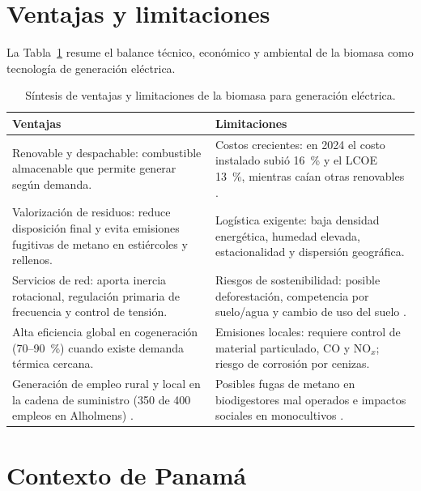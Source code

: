 \section{Ventajas y limitaciones}
\label{sec:ventajas_limitaciones}

La Tabla~\ref{tab:ventajas_limitaciones} resume el balance técnico, económico y ambiental de la biomasa como tecnología de generación eléctrica.

\begin{table}[htbp]
\centering
\caption{Síntesis de ventajas y limitaciones de la biomasa para generación eléctrica.}
\label{tab:ventajas_limitaciones}
\begin{tabularx}{\textwidth}{@{}X X@{}}
\toprule
\textbf{Ventajas} & \textbf{Limitaciones} \\
\midrule
Renovable y despachable: combustible almacenable que permite generar según demanda. & Costos crecientes: en 2024 el costo instalado subió 16~\% y el LCOE 13~\%, mientras caían otras renovables \cite{irena2025costs}. \\
Valorización de residuos: reduce disposición final y evita emisiones fugitivas de metano en estiércoles y rellenos. & Logística exigente: baja densidad energética, humedad elevada, estacionalidad y dispersión geográfica. \\
Servicios de red: aporta inercia rotacional, regulación primaria de frecuencia y control de tensión. & Riesgos de sostenibilidad: posible deforestación, competencia por suelo/agua y cambio de uso del suelo \cite{chum2011ipcc, fao2016befs}. \\
Alta eficiencia global en cogeneración (70--90~\%) cuando existe demanda térmica cercana. & Emisiones locales: requiere control de material particulado, $\mathrm{CO}$ y $\mathrm{NO}_x$; riesgo de corrosión por cenizas. \\
Generación de empleo rural y local en la cadena de suministro (350 de 400 empleos en Alholmens) \cite{alholmenskraft}. & Posibles fugas de metano en biodigestores mal operados \cite{iea2025biogas} e impactos sociales en monocultivos \cite{er2019centroamerica}. \\
\bottomrule
\end{tabularx}
\end{table}

\section{Contexto de Panamá}
\label{sec:panama}

